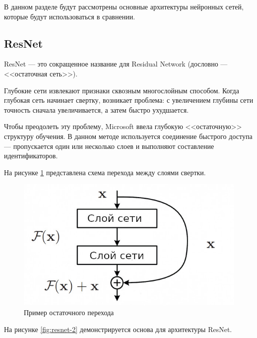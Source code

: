 В данном разделе будут рассмотрены основные архитектуры нейронных сетей, которые будут использоваться в сравнении.

\subsection{ResNet}

ResNet \cite{resnet} --- это сокращенное название для Residual Network (дословно --- <<остаточная сеть>>).

Глубокие сети извлекают признаки сквозным многослойным способом. Когда глубокая сеть начинает свертку, возникает проблема: с увеличением глубины сети точность сначала увеличивается, а затем быстро ухудшается.

Чтобы преодолеть эту проблему, Microsoft ввела глубокую <<остаточную>> структуру обучения. В данном методе используется соединение быстрого доступа --- пропускается один или несколько слоев и выполняют составление идентификаторов.

На рисунке \ref{img:resnet-rus} представлена схема перехода между слоями свертки.

\begin{figure}[ht!]
	\centering
	\includegraphics[width=0.5\linewidth]{assets/resnet-rus.jpeg}
	\caption{Пример остаточного перехода}
	\label{img:resnet-rus}
\end{figure}

На рисунке \ref{fig:resnet-2} демонстрируется основа для архитектуры ResNet.

